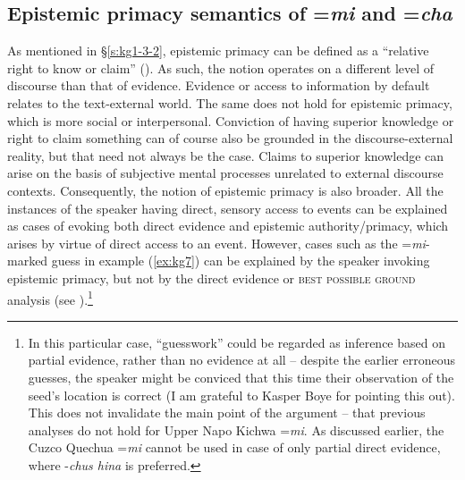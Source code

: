 \documentclass[output=paper]{langscibook}
\begin{document}
\subsection{Epistemic primacy semantics of =\textit{mi} and =\textit{cha}}\label{s:kg4-1}

As mentioned in §‎\ref{s:kg1-3-2}, epistemic primacy can be defined as a “relative right to know or claim” (\citealt{Stivers2011}). As such, the notion operates on a different level of discourse than that of evidence. Evidence or access to information by default relates to the text-external world. The same does not hold for epistemic primacy, which is more social or interpersonal. Conviction of having superior knowledge or right to claim something can of course also be grounded in the discourse-external reality, but that need not always be the case. Claims to superior knowledge can arise on the basis of subjective mental processes unrelated to external discourse contexts. Consequently, the notion of epistemic primacy is also broader. All the instances of the speaker having direct, sensory access to events can be explained as cases of evoking both direct evidence and epistemic authority/primacy, which arises by virtue of direct access to an event. However, cases such as the =\textit{mi}-marked guess in example ‎(\ref{ex:kg7}) can be explained by the speaker invoking epistemic primacy, but not by the direct evidence or \textsc{best possible ground} analysis (see ).\footnote{In this particular case, “guesswork” could be regarded as inference based on partial evidence, rather than no evidence at all – despite the earlier erroneous guesses, the speaker might be conviced that this time their observation of the seed’s location is correct (I am grateful to Kasper Boye for pointing this out). This does not invalidate the main point of the argument – that previous analyses do not hold for Upper Napo Kichwa =\textit{mi}. As discussed earlier, the Cuzco Quechua =\textit{mi} cannot be used in case of only partial direct evidence, where -\textit{chus hina} is preferred.}
\end{document}
